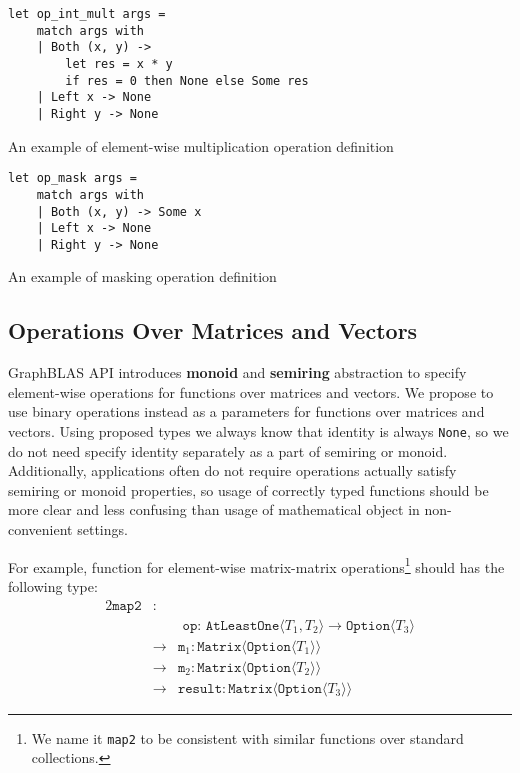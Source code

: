\begin{listing}[h]
    \begin{verbatim}
let op_int_mult args =
    match args with
    | Both (x, y) -> 
        let res = x * y 
        if res = 0 then None else Some res 
    | Left x -> None
    | Right y -> None
    \end{verbatim}
    \caption{An example of element-wise multiplication operation definition}
    \label{lst:opIntMult}
\end{listing}

\begin{listing}[h]
    \begin{verbatim}
let op_mask args =
    match args with
    | Both (x, y) -> Some x
    | Left x -> None
    | Right y -> None
    \end{verbatim}
    \caption{An example of masking operation definition}
    \label{lst:opMask}
\end{listing}

\subsection{Operations Over Matrices and Vectors}

GraphBLAS API introduces \textbf{monoid} and \textbf{semiring} abstraction to specify element-wise operations for functions over matrices and vectors.
We propose to use binary operations instead as a parameters for functions over matrices and vectors. 
Using proposed types we always know that identity is always \texttt{None}, so we do not need specify identity separately as a part of semiring or monoid.
Additionally, applications often do not require operations actually satisfy semiring or monoid properties, so usage of correctly typed functions should be more clear and less confusing than usage of mathematical object in non-convenient settings.

For example, function for element-wise matrix-matrix operations\footnote{We name it \texttt{map2} to be consistent with similar functions over standard collections.} should has the following type:
\begin{alignat*}{2}
    \texttt{map2} & : & \\ 
        &   & \texttt{ op: AtLeastOne} \langle T_1, T_2 \rangle \to \texttt{Option} \langle T_3 \rangle \\
        & \to & \texttt{m}_1: \texttt{Matrix} \langle \texttt{Option} \langle T_1\rangle \rangle \\
        & \to & \texttt{m}_2: \texttt{Matrix} \langle \texttt{Option} \langle T_2 \rangle \rangle \\
        & \to & \texttt{result}: \texttt{Matrix} \langle \texttt{Option} \langle T_3\rangle \rangle
\end{alignat*}

